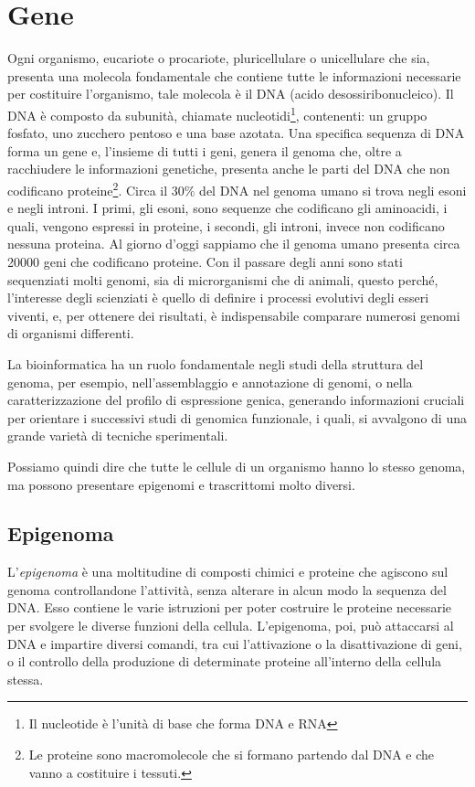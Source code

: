 \section{Gene}\label{sec:cap_one_bioinfo}
Ogni organismo, eucariote o procariote, pluricellulare o unicellulare che sia, presenta una molecola
fondamentale che contiene tutte le informazioni necessarie per costituire l'organismo, tale molecola
è il DNA (acido desossiribonucleico).
Il DNA è composto da subunità, chiamate nucleotidi\footnote{Il nucleotide è l'unità di base che forma DNA e RNA}, contenenti: un gruppo fosfato, uno zucchero
pentoso e una base azotata.
Una specifica sequenza di DNA forma un gene e, l'insieme di tutti i geni, genera il genoma che, oltre
a racchiudere le informazioni genetiche, presenta anche le parti del DNA che non codificano proteine\footnote{Le proteine sono macromolecole che si formano
partendo dal DNA e che vanno a costituire i tessuti.}.
Circa il 30\% del DNA nel genoma umano si trova negli esoni e negli introni. I primi, gli esoni, sono
sequenze che codificano gli aminoacidi, i quali, vengono espressi in proteine, i secondi, gli introni,
invece non codificano nessuna proteina. Al giorno d'oggi sappiamo che il genoma umano presenta
circa 20000 geni che codificano proteine\cite{principiBiochimica}.
Con il passare degli anni sono stati sequenziati molti genomi, sia di microrganismi che di animali,
questo perché, l'interesse degli scienziati è quello di definire i processi evolutivi degli esseri
viventi, e, per ottenere dei risultati, è indispensabile comparare numerosi genomi di
organismi differenti.

La bioinformatica ha un ruolo
fondamentale negli studi della struttura del genoma, per esempio, nell'assemblaggio 
e annotazione di genomi, o nella caratterizzazione del profilo di espressione genica,
generando informazioni cruciali per orientare i successivi studi di genomica funzionale, i quali, si avvalgono di una grande varietà di tecniche sperimentali\cite{fondamentiBioinformatica}.

Possiamo quindi dire che tutte le
cellule di un organismo hanno lo stesso genoma, ma
possono presentare epigenomi e trascrittomi molto
diversi.
\subsection{Epigenoma}\label{subsec:epigenomi}
L'\textit{epigenoma} è una moltitudine di composti chimici e proteine che agiscono sul genoma controllandone l'attività, senza alterare in alcun modo la sequenza del DNA.
Esso contiene le varie istruzioni per poter costruire le proteine necessarie per svolgere le diverse funzioni della cellula.
L'epigenoma, poi, può attaccarsi al DNA e impartire diversi comandi, tra cui l'attivazione o la disattivazione di geni, o il controllo della produzione di
determinate proteine all'interno della cellula stessa.

